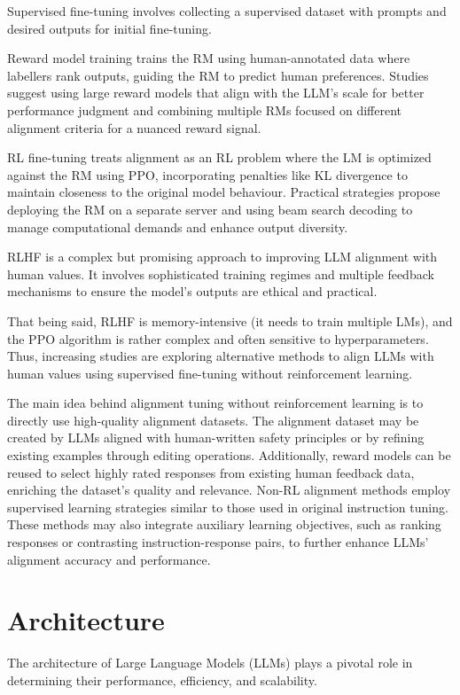 Supervised fine-tuning involves collecting a supervised dataset with prompts and desired outputs for initial fine-tuning.

Reward model training trains the RM using human-annotated data where labellers rank outputs, guiding the RM to predict human preferences.
Studies suggest using large reward models that align with the LLM’s scale for better performance judgment and combining multiple RMs focused on different alignment criteria for a nuanced reward signal.

RL fine-tuning treats alignment as an RL problem where the LM is optimized against the RM using PPO, incorporating penalties like KL divergence to maintain closeness to the original model behaviour.
Practical strategies propose deploying the RM on a separate server and using beam search decoding to manage computational demands and enhance output diversity.

RLHF is a complex but promising approach to improving LLM alignment with human values. It involves sophisticated training regimes and multiple feedback mechanisms to ensure the model's outputs are ethical and practical.

That being said, RLHF is memory-intensive (it needs to train multiple LMs), and the PPO algorithm is rather complex and often sensitive to hyperparameters.
Thus, increasing studies are exploring alternative methods to align LLMs with human values using supervised fine-tuning without reinforcement learning.

The main idea behind alignment tuning without reinforcement learning is to directly use high-quality alignment datasets.
The alignment dataset may be created by LLMs aligned with human-written safety principles or by refining existing examples through editing operations.
Additionally, reward models can be reused to select highly rated responses from existing human feedback data, enriching the dataset's quality and relevance.
Non-RL alignment methods employ supervised learning strategies similar to those used in original instruction tuning.
These methods may also integrate auxiliary learning objectives, such as ranking responses or contrasting instruction-response pairs, to further enhance LLMs' alignment accuracy and performance.

\section{Architecture}
\label{sec:architecture}

The architecture of Large Language Models (LLMs) plays a pivotal role in determining their performance, efficiency, and scalability.

